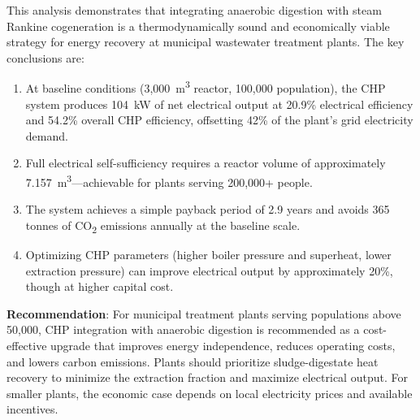 \documentclass[12pt, letterpaper]{article}
\begin{document}
This analysis demonstrates that integrating anaerobic digestion with steam Rankine cogeneration is a thermodynamically sound and economically viable strategy for energy recovery at municipal wastewater treatment plants. The key conclusions are:

\begin{enumerate}
  \item At baseline conditions (3,000~m\textsuperscript{3} reactor, 100,000 population), the CHP system produces \SI{104}{\kilo\watt} of net electrical output at 20.9\% electrical efficiency and 54.2\% overall CHP efficiency, offsetting 42\% of the plant's grid electricity demand.

  \item Full electrical self-sufficiency requires a reactor volume of approximately \SI{7,157}{\cubic\metre}---achievable for plants serving 200,000+ people.

  \item The system achieves a simple payback period of 2.9 years and avoids 365 tonnes of CO\textsubscript{2} emissions annually at the baseline scale.

  \item Optimizing CHP parameters (higher boiler pressure and superheat, lower extraction pressure) can improve electrical output by approximately 20\%, though at higher capital cost.
\end{enumerate}

\textbf{Recommendation}: For municipal treatment plants serving populations above 50,000, CHP integration with anaerobic digestion is recommended as a cost-effective upgrade that improves energy independence, reduces operating costs, and lowers carbon emissions. Plants should prioritize sludge-digestate heat recovery to minimize the extraction fraction and maximize electrical output. For smaller plants, the economic case depends on local electricity prices and available incentives.
\end{document}
